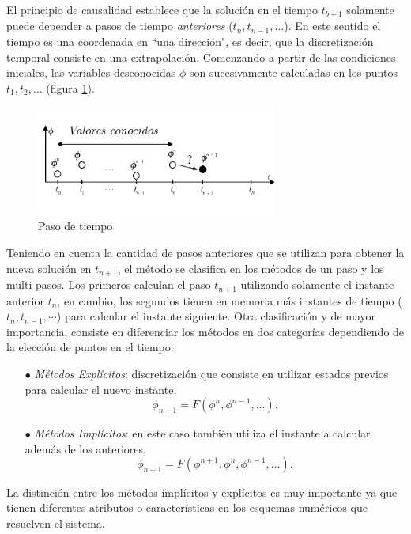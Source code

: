 \documentclass[a4paper,10pt, oneside]{book}
\begin{document}
El principio de causalidad establece que la solución en el tiempo $t_{b+1}$ solamente puede depender a pasos de tiempo \textit{anteriores} ($t_n, t_{n-1}, ...$). En este sentido el tiempo es una coordenada en ``una dirección", es decir, que la discretización temporal consiste en una extrapolación. Comenzando a partir de las condiciones iniciales, las variables desconocidas $\phi$ son sucesivamente calculadas en los puntos $t_1,t_2,...$ (figura \ref{img:5-3}).
\begin{figure}[h!]
	\centering
	\includegraphics[width=8cm]{Img/5-3}
	\caption{Paso de tiempo}
	\label{img:5-3}
\end{figure}

Teniendo en cuenta la cantidad de pasos anteriores que se utilizan para obtener la nueva solución en $t_{n+1}$, el método se clasifica en los métodos de un paso y los multi-pasos. Los primeros calculan el paso $t_{n+1}$ utilizando solamente el instante anterior $t_n$, en cambio, los segundos tienen en memoria más instantes de tiempo ($t_n, t_{n-1},\cdots$) para calcular el instante siguiente. Otra clasificación y de mayor importancia, consiste en diferenciar los métodos en dos categorías dependiendo de la elección de puntos en el tiempo:
\begin{itemize}
	\item[$\bullet$]  \textit{Métodos Explícitos}: discretización que consiste en utilizar estados previos para calcular el nuevo instante,
	\begin{equation}
		\phi_{n+1} = F(\phi^n,\phi^{n-1},...). \nonumber
	\end{equation}
	\item[$\bullet$] \textit{Métodos Implícitos}: en este caso también utiliza el instante a calcular además de los anteriores,
	\begin{equation}
		\phi_{n+1} = F(\phi^{n+1},\phi^n,\phi^{n-1},...). \nonumber
	\end{equation}
\end{itemize}

La distinción entre los métodos implícitos y explícitos es muy importante ya que tienen diferentes atributos o características en los esquemas numéricos que resuelven el sistema.
\end{document}
